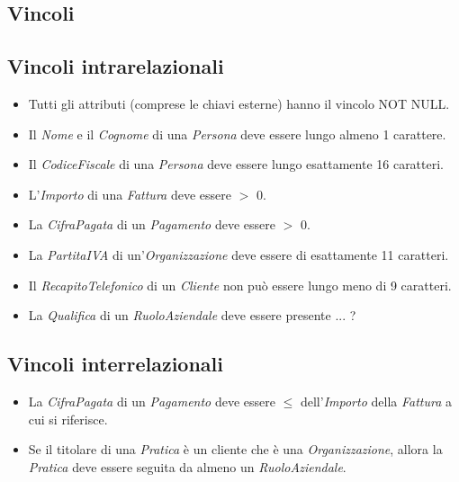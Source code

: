 \documentclass[a4paper,12pt]{article}
\begin{document}
 \subsection{ Vincoli }

\subsection{ Vincoli intrarelazionali }

\begin{itemize}
\item Tutti gli attributi (comprese le chiavi esterne) hanno il vincolo NOT NULL.

\item Il \textit{Nome} e il \textit{Cognome} di una \textit{Persona} deve essere lungo almeno 1 carattere.

\item Il \textit{CodiceFiscale} di una \textit{Persona} deve essere lungo esattamente 16 caratteri.

\item L'\textit{Importo} di una \textit{Fattura} deve essere $>$ 0.

\item La \textit{CifraPagata} di un \textit{Pagamento} deve essere $>$ 0.

\item La \textit{PartitaIVA} di un'\textit{Organizzazione} deve essere di esattamente 11 caratteri.

\item Il \textit{RecapitoTelefonico} di un \textit{Cliente} non può essere lungo meno di 9 caratteri.

\item La \textit{Qualifica} di un \textit{RuoloAziendale} deve essere presente ... ?
\end{itemize}

\subsection{ Vincoli interrelazionali }

\begin{itemize}
\item La \textit{CifraPagata} di un \textit{Pagamento} deve essere $\leq$ dell'\textit{Importo} della \textit{Fattura} a cui si riferisce.

\item Se il titolare di una \textit{Pratica} è un cliente che è una \textit{Organizzazione}, allora la \textit{Pratica} deve essere seguita da almeno un \textit{RuoloAziendale}.
\end{itemize}
\end{document}
